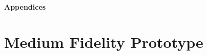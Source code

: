 \documentclass[a4 paper, 12pt]{article}
\begin{document}
    \pagebreak
    
    \label{sec:A.5}


\pagebreak
\begin{center}
    \Huge \textbf{Appendices}
    \section{Medium Fidelity Prototype}
\end{center}

    \pagebreak    
    
                \label{sec:B.1}
    \pagebreak 
    
                \label{sec:B.2} 
    

    \pagebreak 
                        
                \label{sec:B.3}
\end{document}
